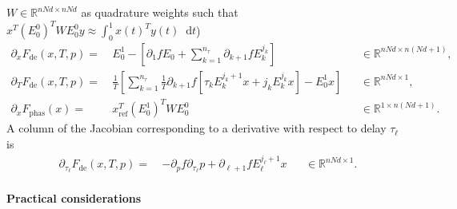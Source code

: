 \documentclass[11pt]{scrartcl}
\renewcommand{\d}{\mathop{}\!\mathrm{d}}
\newcommand{\R}{\mathbb{R}}
\newcommand{\blist}[1]{\mbox{\lstinline!#1!}}
\begin{document}
$W\in\R^{nNd\times nNd}$ as quadrature weights such that
$x^T(E^0_0)^TWE^0_0y\approx \int_0^1x(t)^Ty(t)\d t$)
\begin{align}
  \label{eq:mat:dde}
  \partial_xF_\mathrm{de}(x,T,p)=\ &E^1_0-
  \left[\partial_1fE_0+\sum_{k=1}^{n_\tau}\partial_{k+1}fE^{j_k}_k\right]&&\in\R^{nNd\times n(Nd+1)}\mbox{,}\\
  \label{eq:mat:beta}
  \partial_TF_\mathrm{de}(x,T,p)=\ &\frac{1}{T}\left[
    \sum_{k=1}^{n_\tau}\frac{1}{T}\partial_{k+1}f\left[\tau_kE^{j_k+1}_kx+
      j_kE^{j_k}_kx\right]-E^1_0x\right]&&\in\R^{nNd\times 1}\mbox{,}\\
  \label{eq:mat:phas0}
  \partial_xF_\mathrm{phas}(x)=\ &x_\mathrm{ref}^T(E^1_0)^TWE^0_0&&\in\R^{1\times n(Nd+1)}\mbox{.}
\end{align}
A column of the Jacobian corresponding to a derivative with respect to delay $\tau_\ell$ is
\begin{align}
  \label{eq:mat:tau}
  \partial_{\tau_\ell}F_\mathrm{de}(x,T,p)=\ &-\partial_pf\partial_{\tau_\ell}p+\partial_{\ell+1}fE^{j_\ell+1}_\ell x
  &&\in\R^{nNd\times 1}\mbox{.}
\end{align}

\paragraph{Practical considerations}


\end{document}

